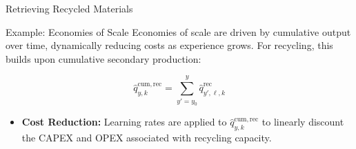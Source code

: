 \documentclass[10pt]{beamer}
\begin{document}
\begin{frame}{Retrieving Recycled Materials}
    \begin{table}[H]
        \centering
        \renewcommand{\arraystretch}{1.6}
    \end{table}
\end{frame}

\begin{frame}{Example: Economies of Scale}
    Economies of scale are driven by cumulative output over time, dynamically reducing costs as experience grows. For recycling, this builds upon cumulative secondary production:
    
    \vspace{0.3cm}
    \begin{equation}
    \hat{q}^{\mathrm{cum,rec}}_{y,k} = \sum_{y'=y_0}^{y} \hat{q}^{\mathrm{rec}}_{y',\ell,k}
    \label{eq:cum-scrap}
    \end{equation}
    \vspace{0.3cm}
    
    \begin{itemize}
        \item \textcolor{metublue}{\textbf{Cost Reduction:}} Learning rates are applied to $\hat{q}^{\mathrm{cum,rec}}_{y,k}$ to linearly discount the CAPEX and OPEX associated with recycling capacity.
    \end{itemize}
\end{frame}
\fi
\end{document}
